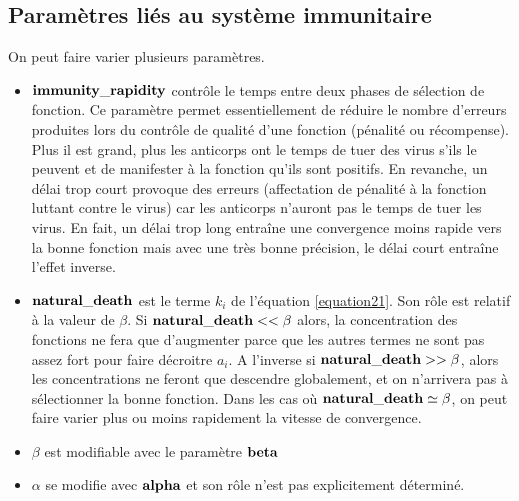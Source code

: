 \documentclass[11pt]{article} %
\numberwithin{equation}{section} %
\begin{document}
	\subsection{Paramètres liés au système immunitaire}
	On peut faire varier plusieurs paramètres.

\begin{itemize}
	\item $\bf{immunity\_rapidity}$ contrôle le temps entre deux phases de sélection de fonction. Ce paramètre permet essentiellement de réduire le nombre d'erreurs produites lors du contrôle de qualité d'une fonction (pénalité ou récompense). Plus il est grand, plus les anticorps ont le temps de tuer des virus s'ils le peuvent et de manifester à la fonction qu'ils sont positifs. En revanche, un délai trop court provoque des erreurs (affectation de pénalité à la fonction luttant contre le virus) car les anticorps n'auront pas le temps de tuer les virus. En fait, un délai trop long entraîne une convergence moins rapide vers la bonne fonction mais avec une très bonne précision, le délai court entraîne l'effet inverse.
	\item $\bf{natural\_death}$ est le terme $k_i$ de l'équation \ref{equation21}. Son rôle est relatif à la valeur de $\beta$. Si $\bf{natural\_death} << \beta$ alors, la concentration des fonctions ne fera que d'augmenter parce que les autres termes ne sont pas assez fort pour faire décroitre $a_i$. A l'inverse si $\bf{natural\_death} >> \beta$, alors les concentrations ne feront que descendre globalement, et on n'arrivera pas à sélectionner la bonne fonction. Dans les cas où $\bf{natural\_death} \simeq \beta$, on peut faire varier plus ou moins rapidement la vitesse de convergence.
	\item $\beta$ est modifiable avec le paramètre $\bf{beta}$
	\item $\alpha$ se modifie avec $\bf{alpha}$ et son rôle n'est pas explicitement déterminé.
\end{itemize}
\nocite{ref2}


\end{document}
